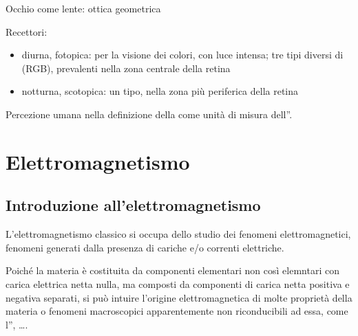 \documentclass[letterpaper,10pt,italian]{jupyterBook}
\begin{document}
\sphinxAtStartPar
Occhio come lente: ottica geometrica

\sphinxAtStartPar
Recettori:
\begin{itemize}
\item {} 
\sphinxAtStartPar
diurna, fotopica: per la visione dei colori, con luce intensa; tre tipi diversi di  (RGB), prevalenti nella zona centrale della retina

\item {} 
\sphinxAtStartPar
notturna, scotopica: un tipo, nella zona più periferica della retina

\end{itemize}

\sphinxAtStartPar
Percezione umana nella definizione della  come unità di misura dell”{\hyperref[\detokenize{ch/intro/physical_quantities-luminosity:physics-hs-intro-physical-quantities-luminosity}]{}}.

\sphinxstepscope


\part{Elettromagnetismo}

\sphinxstepscope


\chapter{Introduzione all’elettromagnetismo}
\label{\detokenize{ch/electromagnetism/intro:introduzione-all-elettromagnetismo}}\label{\detokenize{ch/electromagnetism/intro:physics-hs-electromagnetism-intro}}\label{\detokenize{ch/electromagnetism/intro::doc}}
\sphinxAtStartPar
L’elettromagnetismo classico si occupa dello studio dei fenomeni elettromagnetici, fenomeni generati dalla presenza di cariche e/o correnti elettriche.%
\begin{footnote}[1]\sphinxAtStartFootnote
Poiché la materia è costituita da componenti elementari \sphinxhyphen{} non così elemntari \sphinxhyphen{} con carica elettrica netta nulla, ma composti da componenti di carica netta positiva e negativa separati, si può intuire l’origine elettromagnetica di molte proprietà della materia o fenomeni macroscopici apparentemente non riconducibili ad essa, come l”{\hyperref[\detokenize{ch/thermodynamics/heat-transmission:physics-hs-thermodynamics-heat-transmission-radiation}]{}}, ….
%
\end{footnote}
\end{document}
